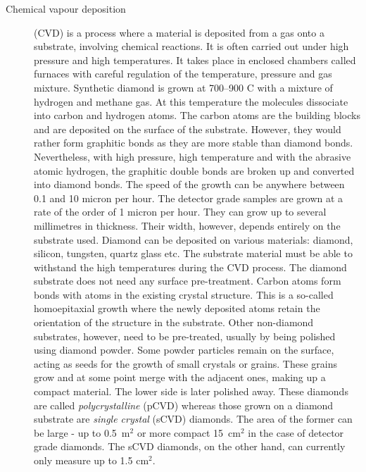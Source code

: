 \documentclass[twoside,12pt]{packages/mytustyle}  %
\begin{document}
\begin{description}
\item[Chemical vapour deposition] (CVD) is a process where a material is deposited from a gas onto a substrate, involving chemical reactions. It is often carried out under high pressure and high temperatures. It takes place in enclosed chambers called furnaces with careful regulation of the temperature, pressure and gas mixture. Synthetic diamond is grown at 700--900 \textdegree C with a mixture of hydrogen and methane gas. At this temperature the molecules dissociate into carbon and hydrogen atoms. The carbon atoms are the building blocks and are deposited on the surface of the substrate. However, they would rather form graphitic bonds as they are more stable than diamond bonds. Nevertheless, with high pressure, high temperature and with the abrasive atomic hydrogen, the graphitic double bonds are broken up and converted into diamond bonds. The speed of the growth can be anywhere between 0.1 and 10 micron per hour. The detector grade samples are grown at a rate of the order of 1 micron per hour. They can grow up to several millimetres in thickness. Their width, however, depends entirely on the substrate used. Diamond can be deposited on various materials: diamond, silicon, tungsten, quartz glass etc. The substrate material must be able to withstand the high temperatures during the CVD process. The diamond substrate does not need any surface pre-treatment. Carbon atoms form bonds with atoms in the existing crystal structure. This is a so-called homoepitaxial growth where the newly deposited atoms retain the orientation of the structure in the substrate. Other non-diamond substrates, however, need to be pre-treated, usually by being polished using diamond powder. Some powder particles remain on the surface, acting as seeds for the growth of small crystals or grains. These grains grow and at some point merge with the adjacent ones, making up a compact material. The lower side is later polished away. These diamonds are called \emph{polycrystalline} (pCVD) whereas those grown on a diamond substrate are \emph{single crystal} (sCVD) diamonds. The area of the former can be large - up to 0.5~m$^2$ or more compact 15~cm$^2$ in the case of detector grade diamonds. The sCVD diamonds, on the other hand, can currently only measure up to 1.5 cm$^2$.
\end{description}




{}

\end{document}
